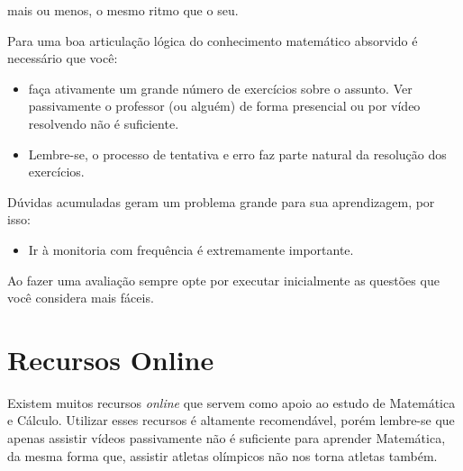 \begin{description}
        mais ou menos, o mesmo ritmo que o seu.
    \item[\textcolor{blue}{Passo 4}] Para uma boa articulação lógica do conhecimento matemático absorvido é necessário que você:
        \begin{itemize}
            \item faça ativamente um grande número de exercícios sobre o assunto. Ver passivamente o professor
                (ou alguém) de forma presencial ou por vídeo resolvendo não é suficiente.
            \item Lembre-se, o processo de tentativa e erro faz parte natural da resolução dos exercícios.
        \end{itemize}
    \item[\textcolor{blue}{Passo 5}] Dúvidas acumuladas geram um problema grande para sua aprendizagem, por isso:
        \begin{itemize}
            \item Ir à monitoria com frequência é extremamente importante.
        \end{itemize}
\end{description}
Ao fazer uma avaliação sempre opte por executar inicialmente as questões que você considera mais fáceis.

\section*{Recursos Online}

Existem muitos recursos \textit{online} que servem como apoio ao estudo de Matemática e Cálculo.
Utilizar esses recursos é altamente recomendável, porém lembre-se que apenas assistir vídeos passivamente
não é suficiente para aprender Matemática, da mesma forma que, assistir atletas olímpicos não nos torna
atletas também.

